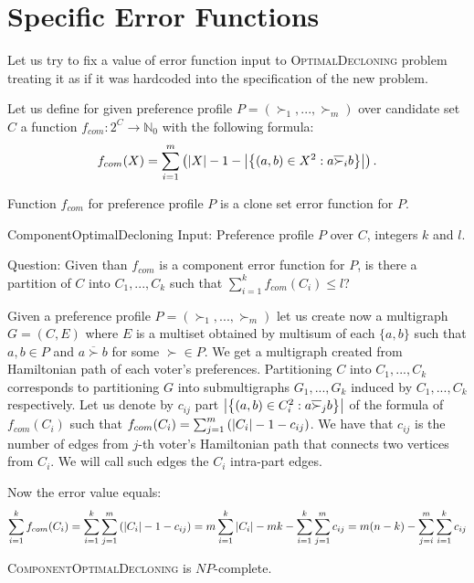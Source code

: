 \section{Specific Error Functions}

Let us try to fix a value of error function input to \textsc{OptimalDecloning} problem
treating it as if it was hardcoded into the specification of the new problem.



\begin{defn}
Let us define for given preference profile $P = (\succ_1, ..., \succ_m)$ over candidate set $C$
a function $f_{com}: 2^C \rightarrow \mathbb{N}_0$ with the following formula:
$$ f_{com}(X) = \sum_{i=1}^m \left( \left\vert X \right\vert-1 -
\left\vert \left\lbrace \left( a,b \right) \in X^2 : a \overline{\succ}_i b \right\rbrace  \right\vert
\right) \text{.}$$
\end{defn}

\begin{rmrk}
Function $f_{com}$ for preference profile $P$ is a clone set error function for $P$.
\end{rmrk}

\begin{problem}{ComponentOptimalDecloning}
	Input: Preference profile $P$ over $C$, integers $k$ and $l$.

	Question: Given than $f_{com}$ is a component error function for $P$,
		is there a partition of $C$ into $C_1, ..., C_k$ such that $\sum_{i=1}^k f_{com}(C_i) \leq l$?
\end{problem}

Given a preference profile $P = (\succ_1, ..., \succ_m)$ let us create now a multigraph $G=(C,E)$
where $E$ is a multiset obtained by multisum
of each $\{a,b\}$ such that $a,b \in P$ and $a \overline{\succ} b$ for some $\succ \in P$.
We get a multigraph created from Hamiltonian path of each voter's preferences.
Partitioning $C$ into $C_1,...,C_k$ corresponds to
partitioning $G$ into submultigraphs $G_1,...,G_k$ induced by $C_1,...,C_k$ respectively.
Let us denote by $c_{ij}$ part
$\left\vert \left\lbrace \left( a,b \right) \in C_i^2 : a \overline{\succ}_j b \right\rbrace  \right\vert$
of the formula of $f_{com}(C_i)$ such that
$f_{com}(C_i) = \sum_{j=1}^m \left( \left\vert C_i \right\vert - 1 - c_{ij} \right)$.
We have that $c_{ij}$ is the number of edges from $j$-th voter's Hamiltonian path
that connects two vertices from $C_i$.
We will call such edges the $C_i$ intra-part edges.

Now the error value equals:
$$
\sum_{i=1}^k f_{com}(C_i) =
\sum_{i=1}^k \sum_{j=1}^m \left( \left\vert C_i \right\vert - 1 - c_{ij} \right) =
m \sum_{i=1}^k \left\vert C_i \right\vert - m k - \sum_{i=1}^k \sum_{j=1}^m c_{ij} =
m(n-k) - \sum_{j=i}^m \sum_{i=1}^k c_{ij}
$$




\begin{thm}
\textsc{ComponentOptimalDecloning} is $NP$-complete.
\end{thm}
